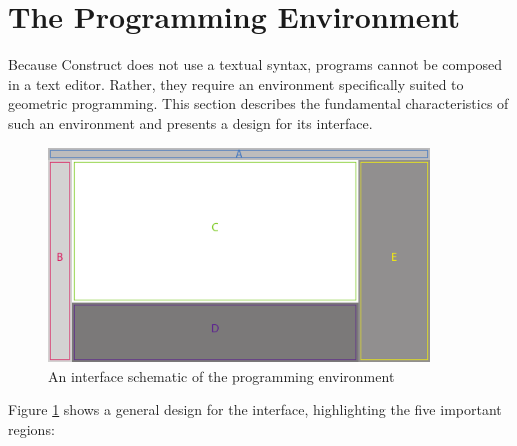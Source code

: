 \documentclass[twoside,openright,11pt]{report}
\begin{document}
\section{The Programming Environment}
\label{sec:environ}

Because Construct does not use a textual syntax, programs cannot be composed in a text editor. 
Rather, they require an environment specifically suited to geometric programming. 
This section describes the fundamental characteristics of such an environment and presents a design for its interface.

\begin{figure}[h]
  \centering
  \includegraphics[width=0.9\textwidth]{interface.pdf}
  \caption{An interface schematic of the programming environment}
  \label{fig:interface}
\end{figure}

Figure \ref{fig:interface} shows a general design for the interface, highlighting the five important regions:
\end{document}
